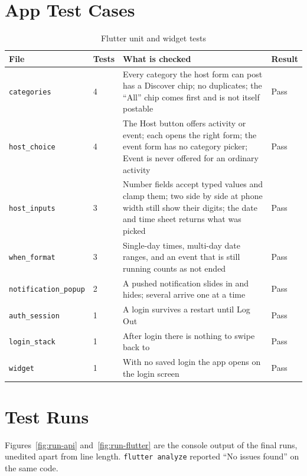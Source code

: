 \section{App Test Cases}

\begin{table}[H]
\centering
\begin{tabular}{|L{3.3cm}|p{1.1cm}|L{5.6cm}|p{1.4cm}|}
\hline
\textbf{File} & \textbf{Tests} & \textbf{What is checked} & \textbf{Result} \\
\hline
\texttt{\footnotesize categories} & 4 & Every category the host form can post has a Discover chip; no duplicates; the ``All'' chip comes first and is not itself postable & Pass \\
\hline
\texttt{\footnotesize host\_choice} & 4 & The Host button offers activity or event; each opens the right form; the event form has no category picker; Event is never offered for an ordinary activity & Pass \\
\hline
\texttt{\footnotesize host\_inputs} & 3 & Number fields accept typed values and clamp them; two side by side at phone width still show their digits; the date and time sheet returns what was picked & Pass \\
\hline
\texttt{\footnotesize when\_format} & 3 & Single-day times, multi-day date ranges, and an event that is still running counts as not ended & Pass \\
\hline
\texttt{\footnotesize notification\_popup} & 2 & A pushed notification slides in and hides; several arrive one at a time & Pass \\
\hline
\texttt{\footnotesize auth\_session} & 1 & A login survives a restart until Log Out & Pass \\
\hline
\texttt{\footnotesize login\_stack} & 1 & After login there is nothing to swipe back to & Pass \\
\hline
\texttt{\footnotesize widget} & 1 & With no saved login the app opens on the login screen & Pass \\
\hline
\end{tabular}
\caption{Flutter unit and widget tests}
\label{tab:fluttertests}
\end{table}

\section{Test Runs}

Figures~\ref{fig:run-api} and~\ref{fig:run-flutter} are the console output of the final
runs, unedited apart from line length. \texttt{flutter analyze} reported ``No issues found''
on the same code.

